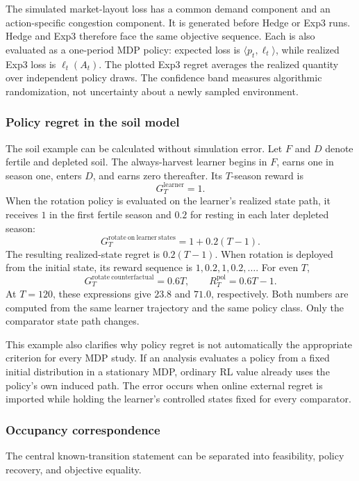 The simulated market-layout loss has a common demand component and an action-specific congestion component. It is generated before Hedge or Exp3 runs. Hedge and Exp3 therefore face the same objective sequence. Each is also evaluated as a one-period MDP policy: expected loss is $\langle p_t,\ell_t\rangle$, while realized Exp3 loss is $\ell_t(A_t)$. The plotted Exp3 regret averages the realized quantity over independent policy draws. The confidence band measures algorithmic randomization, not uncertainty about a newly sampled environment.

\subsubsection{Policy regret in the soil model}

The soil example can be calculated without simulation error. Let $F$ and $D$ denote fertile and depleted soil. The always-harvest learner begins in $F$, earns one in season one, enters $D$, and earns zero thereafter. Its $T$-season reward is
\[
G_T^{\mathrm{learner}}=1.
\]
When the rotation policy is evaluated on the learner's realized state path, it receives $1$ in the first fertile season and $0.2$ for resting in each later depleted season:
\[
G_T^{\mathrm{rotate\ on\ learner\ states}}=1+0.2(T-1).
\]
The resulting realized-state regret is $0.2(T-1)$. When rotation is deployed from the initial state, its reward sequence is $1,0.2,1,0.2,\ldots$. For even $T$,
\[
G_T^{\mathrm{rotate\ counterfactual}}=0.6T,
\qquad
R_T^{\mathrm{pol}}=0.6T-1.
\]
At $T=120$, these expressions give $23.8$ and $71.0$, respectively. Both numbers are computed from the same learner trajectory and the same policy class. Only the comparator state path changes.

This example also clarifies why policy regret is not automatically the appropriate criterion for every MDP study. If an analysis evaluates a policy from a fixed initial distribution in a stationary MDP, ordinary RL value already uses the policy's own induced path. The error occurs when online external regret is imported while holding the learner's controlled states fixed for every comparator.

\subsubsection{Occupancy correspondence}

The central known-transition statement can be separated into feasibility, policy recovery, and objective equality.

